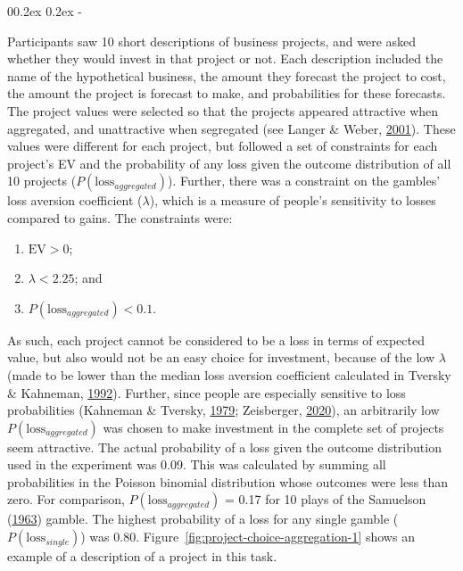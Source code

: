 \documentclass[
  english,
  man, donotrepeattitle,floatsintext]{apa7}
\makeatletter
\let\oldsubparagraph\subparagraph
\renewcommand{\subparagraph}[1]{\oldsubparagraph{#1}\mbox{}}
\renewcommand{\subparagraph}[1]{\@startsection{subparagraph}{5}{1em}%
  {0\baselineskip \@plus 0.2ex \@minus 0.2ex}%
  {-\z@\relax}%
  {\normalfont\normalsize\itshape\hspace{\parindent}{#1}\textit{\addperi}}{\relax}}
\theoremstyle{definition}
\theoremstyle{definition}
\theoremstyle{definition}
\theoremstyle{definition}
\theoremstyle{remark}
\makeatother
\begin{document}
\hypertarget{task-aggregation-1}{%
\subparagraph{Risky Investment Task}\label{task-aggregation-1}}

Participants saw 10 short descriptions of business projects, and were asked
whether they would invest in that project or not. Each description included the
name of the hypothetical business, the amount they forecast the project to cost,
the amount the project is forecast to make, and probabilities for these
forecasts. The project values were selected so that the projects appeared
attractive when aggregated, and unattractive when segregated (see Langer \& Weber, \protect\hyperlink{ref-langer2001}{2001}).
These values were different for each project, but followed a set of constraints
for each project's EV and the probability of any loss given the outcome
distribution of all 10 projects (\(P(\text{loss}_{aggregated})\)). Further, there
was a constraint on the gambles' loss aversion coefficient (\(\lambda\)), which is
a measure of people's sensitivity to losses compared to gains. The constraints
were:

\begin{enumerate}
\def\labelenumi{\arabic{enumi}.}
\item
  \(\text{EV} > 0\);
\item
  \(\lambda < 2.25\); and
\item
  \(P(\text{loss}_{aggregated}) < 0.1\).
\end{enumerate}

As such, each project cannot be considered to be a loss in terms of expected
value, but also would not be an easy choice for investment, because of the low
\(\lambda\) (made to be lower than the median loss aversion coefficient calculated
in Tversky \& Kahneman, \protect\hyperlink{ref-tversky1992}{1992}). Further, since people are especially sensitive to loss
probabilities (Kahneman \& Tversky, \protect\hyperlink{ref-kahneman1979}{1979}; Zeisberger, \protect\hyperlink{ref-zeisberger2020}{2020}), an arbitrarily low
\(P(\text{loss}_{aggregated})\) was chosen to make investment in the complete set
of projects seem attractive. The actual probability of a loss given the outcome
distribution used in the experiment was 0.09.
This was calculated by summing all probabilities in the Poisson binomial
distribution whose outcomes were less than zero. For comparison,
\(P(\text{loss}_{aggregated})\) = 0.17
for 10 plays of the Samuelson (\protect\hyperlink{ref-samuelson1963}{1963}) gamble. The highest probability of a loss for
any single gamble (\(P(\text{loss}_{single})\)) was
0.80.
Figure~\ref{fig:project-choice-aggregation-1} shows an example of a description
of a project in this task.
\end{document}
